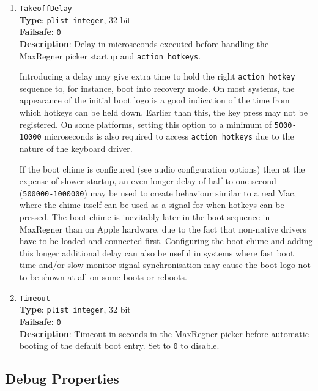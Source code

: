 \documentclass[]{article}
\makeatletter
\renewcommand{\label}[1]{%
\zref@wrapper@immediate{\oldlabel{#1}}}  %
\makeatother
\begin{document}
\begin{enumerate}
\item
  \texttt{TakeoffDelay}\\
  \textbf{Type}: \texttt{plist\ integer}, 32 bit\\
  \textbf{Failsafe}: \texttt{0}\\
  \textbf{Description}: Delay in microseconds executed before handling
  the MaxRegner picker startup and \texttt{action hotkeys}.

  Introducing a delay may give extra time to hold the right \texttt{action hotkey}
  sequence to, for instance, boot into recovery mode. On most systems, the appearance
  of the initial boot logo is a good indication of the time from which hotkeys can be
  held down. Earlier than this, the key press may not be registered. On some platforms,
  setting this option to a minimum of \texttt{5000-10000} microseconds is also required
  to access \texttt{action hotkeys} due to the nature of the keyboard driver.

  If the boot chime is configured (see audio configuration options) then at the expense
  of slower startup, an even longer delay of half to one second (\texttt{500000-1000000})
  may be used to create behaviour similar to a real Mac, where the chime itself can be used
  as a signal for when hotkeys can be pressed. The boot chime is inevitably later in the boot
  sequence in MaxRegner than on Apple hardware, due to the fact that non-native drivers
  have to be loaded and connected first. Configuring the boot chime and adding this longer
  additional delay can also be useful in systems where fast boot time and/or slow monitor signal
  synchronisation may cause the boot logo not to be shown at all on some boots or reboots.

\item
  \texttt{Timeout}\\
  \textbf{Type}: \texttt{plist\ integer}, 32 bit\\
  \textbf{Failsafe}: \texttt{0}\\
  \textbf{Description}: Timeout in seconds in the MaxRegner picker before
  automatic booting of the default boot entry. Set to \texttt{0} to disable.

\end{enumerate}

\subsection{Debug Properties}\label{miscdebugprops}
\end{document}

